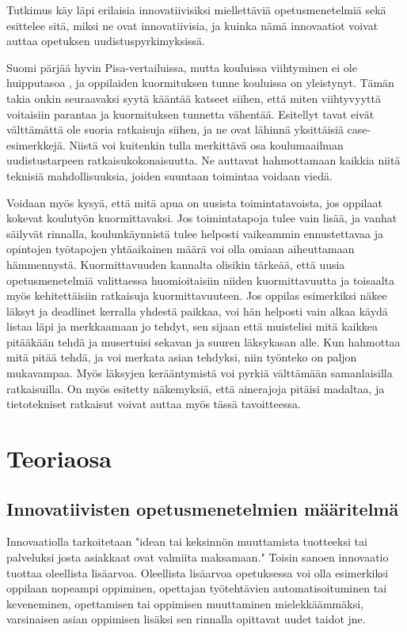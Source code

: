 \documentclass[utf8,bachelor]{gradu3}
\begin{document}
Tutkimus käy läpi erilaisia innovatiivisiksi miellettäviä opetusmenetelmiä sekä esittelee sitä, miksi ne ovat innovatiivisia, ja kuinka nämä innovaatiot voivat auttaa opetuksen uudistuspyrkimyksissä. %

Suomi pärjää hyvin Pisa-vertailuissa, mutta kouluissa viihtyminen ei ole huipputasoa \parencite[][]{kouluViihtyvyys}, ja oppilaiden kuormituksen tunne kouluissa on yleistynyt. \parencite [][]{oppilaidenKuormitus} Tämän takia onkin seuraavaksi syytä kääntää katseet siihen, että miten viihtyvyyttä voitaisiin parantaa ja kuormituksen tunnetta vähentää. Esitellyt tavat eivät välttämättä ole suoria ratkaisuja siihen, ja ne ovat lähinnä yksittäisiä case-esimerkkejä. Niistä voi kuitenkin tulla merkittävä osa koulumaailman uudistustarpeen ratkaisukokonaisuutta. Ne auttavat hahmottamaan kaikkia niitä teknisiä mahdollisuuksia, joiden suuntaan toimintaa voidaan viedä. 

Voidaan myös kysyä, että mitä apua on uusista toimintatavoista, jos oppilaat kokevat koulutyön kuormittavaksi. Jos toimintatapoja tulee vain lisää, ja vanhat säilyvät rinnalla, koulunkäynnistä tulee helposti vaikeammin ennustettavaa ja opintojen työtapojen yhtäaikainen määrä voi olla omiaan aiheuttamaan hämmennystä. Kuormittavuuden kannalta olisikin tärkeää, että uusia opetusmenetelmiä valittaessa huomioitaisiin niiden kuormittavuutta ja toisaalta myös kehitettäisiin ratkaisuja kuormittavuuteen. Jos oppilas esimerkiksi näkee läksyt ja deadlinet kerralla yhdestä paikkaa, voi hän helposti vain alkaa käydä listaa läpi ja merkkaamaan jo tehdyt, sen sijaan että muistelisi mitä kaikkea pitääkään tehdä ja musertuisi sekavan ja suuren läksykasan alle. Kun hahmottaa mitä pitää tehdä, ja voi merkata asian tehdyksi, niin työnteko on paljon mukavampaa. Myös läksyjen kerääntymistä voi pyrkiä välttämään samanlaisilla ratkaisuilla. On myös esitetty näkemyksiä, että ainerajoja pitäisi madaltaa, ja tietotekniset ratkaisut voivat auttaa myös tässä tavoitteessa.

\chapter{Teoriaosa}
\section{Innovatiivisten opetusmenetelmien määritelmä}
Innovaatiolla tarkoitetaan "idean tai keksinnön muuttamista tuotteeksi tai palveluksi josta asiakkaat ovat valmiita maksamaan." \parencite[][]{innovaatio} Toisin sanoen innovaatio tuottaa oleellista lisäarvoa. Oleellista lisäarvoa opetuksessa voi olla esimerkiksi oppilaan nopeampi oppiminen, opettajan työtehtävien automatisoituminen tai keveneminen, opettamisen tai oppimisen muuttaminen mielekkäämmäksi, varsinaisen asian oppimisen lisäksi sen rinnalla opittavat uudet taidot jne.
\end{document}
